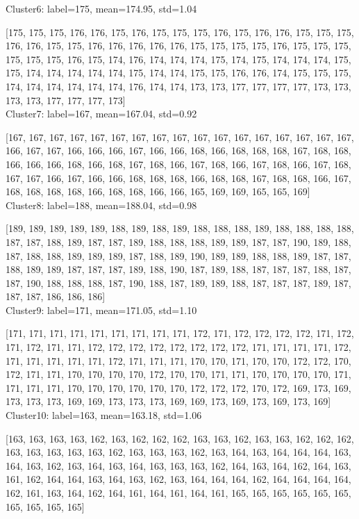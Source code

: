 \documentclass{article}
\begin{document}
\begin{latin}
Cluster6: label=175, mean=174.95, std=1.04

[175, 175, 175, 176, 176, 175, 176, 175, 175, 175, 176, 175, 176, 176, 175, 175, 175, 176, 176, 175, 175, 176, 176, 176, 176, 176, 175, 175, 175, 175, 176, 175, 175, 175, 175, 175, 175, 176, 175, 174, 176, 174, 174, 174, 175, 174, 175, 174, 174, 174, 175, 175, 174, 174, 174, 174, 174, 175, 174, 174, 175, 175, 176, 176, 174, 175, 175, 175, 174, 174, 174, 174, 174, 174, 176, 174, 174, 173, 173, 177, 177, 177, 177, 173, 173, 173, 173, 177, 177, 177, 173]
\\

Cluster7: label=167, mean=167.04, std=0.92

[167, 167, 167, 167, 167, 167, 167, 167, 167, 167, 167, 167, 167, 167, 167, 167, 167, 166, 167, 167, 166, 166, 166, 167, 166, 166, 168, 166, 168, 168, 168, 167, 168, 168, 166, 166, 166, 168, 166, 168, 167, 168, 166, 167, 168, 166, 167, 168, 166, 167, 168, 167, 167, 166, 167, 166, 166, 168, 168, 168, 166, 168, 168, 167, 168, 168, 166, 167, 168, 168, 168, 168, 166, 168, 168, 166, 166, 165, 169, 169, 165, 165, 169]
\\

Cluster8: label=188, mean=188.04, std=0.98

[189, 189, 189, 189, 189, 188, 189, 188, 189, 188, 188, 188, 189, 188, 188, 188, 188, 187, 187, 188, 189, 187, 187, 189, 188, 188, 188, 189, 189, 187, 187, 190, 189, 188, 187, 188, 188, 189, 189, 189, 187, 188, 189, 190, 189, 189, 188, 188, 189, 187, 187, 188, 189, 189, 187, 187, 187, 189, 188, 190, 187, 189, 188, 187, 187, 187, 188, 187, 187, 190, 188, 188, 188, 187, 190, 188, 187, 189, 189, 188, 187, 187, 187, 189, 187, 187, 187, 186, 186, 186]
\\

Cluster9: label=171, mean=171.05, std=1.10

[171, 171, 171, 171, 171, 171, 171, 171, 171, 172, 171, 172, 172, 172, 172, 171, 172, 171, 172, 171, 171, 172, 172, 172, 172, 172, 172, 172, 172, 171, 171, 171, 171, 172, 171, 171, 171, 171, 171, 172, 171, 171, 171, 170, 170, 171, 170, 170, 172, 172, 170, 172, 171, 171, 170, 170, 170, 170, 172, 170, 170, 171, 171, 170, 170, 170, 170, 171, 171, 171, 171, 170, 170, 170, 170, 170, 170, 172, 172, 172, 170, 172, 169, 173, 169, 173, 173, 173, 169, 169, 173, 173, 173, 169, 169, 173, 169, 173, 169, 173, 169]
\\

Cluster10: label=163, mean=163.18, std=1.06

[163, 163, 163, 163, 162, 163, 162, 162, 162, 163, 163, 162, 163, 163, 162, 162, 162, 163, 163, 163, 163, 163, 162, 163, 163, 163, 162, 163, 164, 163, 164, 164, 164, 163, 164, 163, 162, 163, 164, 163, 164, 163, 163, 163, 162, 164, 163, 164, 162, 164, 163, 161, 162, 164, 164, 163, 164, 163, 162, 163, 164, 164, 164, 162, 164, 164, 164, 164, 162, 161, 163, 164, 162, 164, 161, 164, 161, 164, 161, 165, 165, 165, 165, 165, 165, 165, 165, 165, 165]
\end{latin}
\end{document}
